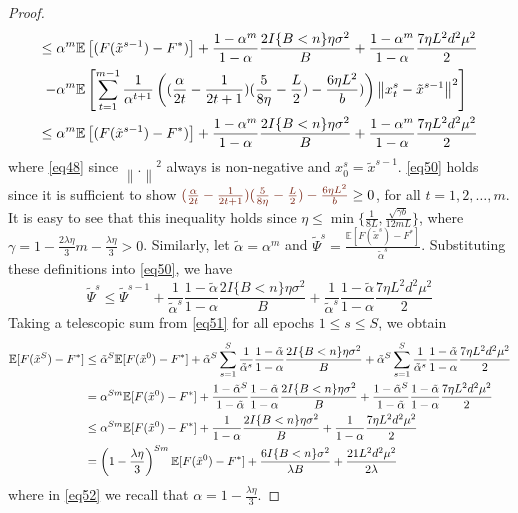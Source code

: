 \documentclass{article}
\newcommand*{\E}{\mathbb{E}}
\newcommand{\norm}[1]{\left\lVert#1\right\rVert}
\theoremstyle{definition}
\theoremstyle{remark}
\begin{document}
\begin{proof}
{\begin{align}
\leq\alpha^m\E&\left[(F(\tilde{x}^{s-1}) - F^*)\right] + \frac{1-\alpha^m}{1-\alpha}\frac{2I\{B < n\}\eta \sigma ^2}{B}+\frac{1-\alpha^m}{1-\alpha}\frac{7 \eta L^2 d^2 \mu^2}{2}\notag
\\-\alpha^m\E&\left[\sum_{t=1}^{m-1}\frac{1}{\alpha^{t+1}}\left((\frac{\alpha}{2t} - \frac{1}{2t+1})(\frac{5}{8\eta} - \frac{L}{2})-\frac{6 \eta L^2}{b})\right) \norm{x_{t}^s-\tilde{x}^{s-1}}^2 \right]\notag\\
\leq\alpha^m\E&\left[(F(\tilde{x}^{s-1}) - F^*)\right] + \frac{1-\alpha^m}{1-\alpha}\frac{2I\{B < n\}\eta \sigma ^2}{B}+\frac{1-\alpha^m}{1-\alpha}\frac{7 \eta L^2 d^2 \mu^2}{2}\label{eq50}
\end{align}
}
where \eqref{eq48} since $\norm{.}^2$ always is non-negative and $x_0^s=\tilde{x}^{s-1}$. \eqref{eq50} holds since it is sufficient to show ${\color{Brown} (\frac{\alpha}{2t} - \frac{1}{2t+1})(\frac{5}{8\eta} - \frac{L}{2})- \frac{6\eta L^2}{b}} \geq 0$, for all $t=1, 2,\ldots, m$. 
It is easy to see that this inequality holds since $\eta \leq \min\{\frac{1}{8L}, \frac{\sqrt{\gamma b}}{12 m L }\}$, where $\gamma = 1-\frac{2\lambda\eta}{3} m-\frac{\lambda\eta}{3} > 0$. Similarly, let  $\tilde{\alpha} = \alpha^m$ and $\tilde{\Psi}^s = \frac{\E[F(\tilde{x}^{s})-F^*]}{\tilde{\alpha}^s}$. Substituting these definitions into \eqref{eq50}, we have
{\color{Brown}
\begin{equation}\label{eq51}
\tilde{\Psi}^s \leq \tilde{\Psi}^{s-1} + \frac{1}{\tilde{\alpha}^s} \frac{1-\tilde{\alpha}}{1-{\alpha}}\frac{2 I\{B < n\}\eta \sigma ^2}{B}+ \frac{1}{\tilde{\alpha}^s} \frac{1-\tilde{\alpha}}{1-{\alpha}}\frac{7\eta L^2 d^2 \mu^2}{2}
\end{equation}
}
Taking a telescopic sum from \eqref{eq51} for all epochs $1 \leq s \leq S$, we obtain
{\color{Brown}
\begin{align}
\E[F(\tilde{x}^S) - {F}^*] & \leq \tilde{\alpha}^{S} \E[F(\tilde{x}^0) - {F}^*] + \tilde{\alpha}^{S} \sum_{s=1}^S \frac{1}{\tilde{\alpha}^s}\frac{1-\tilde{\alpha}}{1-{\alpha}}\frac{2I\{B < n\}\eta \sigma ^2}{B} + \tilde{\alpha}^{S} \sum_{s=1}^S \frac{1}{\tilde{\alpha}^s}\frac{1-\tilde{\alpha}}{1-{\alpha}}\frac{7 \eta L^2 d^2 \mu^2}{2}\notag\\
& = {\alpha}^{Sm} \E[F(\tilde{x}^0) - {F}^*] + \frac{1-\tilde{\alpha}^S}{1-\tilde{\alpha}}\frac{1-\tilde{\alpha}}{1-{\alpha}}\frac{2I\{B < n\}\eta \sigma ^2}{B}+ \frac{1-\tilde{\alpha}^S}{1-\tilde{\alpha}}\frac{1-\tilde{\alpha}}{1-{\alpha}}\frac{7 \eta L^2 d^2 \mu^2}{2}\notag\\
& \leq {\alpha}^{Sm} \E[F(\tilde{x}^0) - {F}^*] + \frac{1}{1-{\alpha}}\frac{2 I\{B < n\}\eta \sigma ^2}{B}+ \frac{1}{1-{\alpha}}\frac{7 \eta L^2 d^2 \mu^2}{2}\notag\\
& = \left(1-\frac{\lambda\eta}{3}\right)^{Sm} \E[F(\tilde{x}^0) - {F}^*] + \frac{6I\{B < n\} \sigma ^2}{\lambda B}+\frac{21 L^2 d^2 \mu^2}{2\lambda}\label{eq52}
\end{align}
}
where in \eqref{eq52} we recall that {\color{Brown}$\alpha = 1-\frac{\lambda\eta}{3}$}.
\end{proof}
\end{document}

